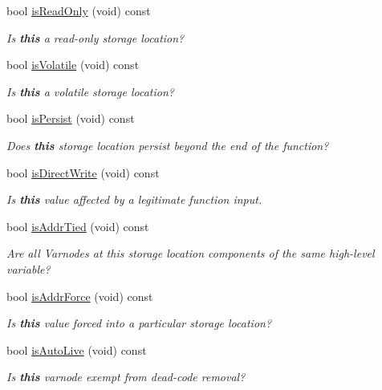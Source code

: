 \begin{DoxyCompactItemize}
bool \mbox{\hyperlink{class_varnode_a913083bc0e21082b8f2d2c19c479149f}{is\+Read\+Only}} (void) const
\begin{DoxyCompactList}\small\item\em Is {\bfseries{this}} a read-\/only storage location? \end{DoxyCompactList}\item 
bool \mbox{\hyperlink{class_varnode_ac93bac59635c06a0cf7092de6eddf1ff}{is\+Volatile}} (void) const
\begin{DoxyCompactList}\small\item\em Is {\bfseries{this}} a volatile storage location? \end{DoxyCompactList}\item 
bool \mbox{\hyperlink{class_varnode_aec0966bf2652cfd2d53a053f8df9fde1}{is\+Persist}} (void) const
\begin{DoxyCompactList}\small\item\em Does {\bfseries{this}} storage location persist beyond the end of the function? \end{DoxyCompactList}\item 
bool \mbox{\hyperlink{class_varnode_a9d5173dcb168690858927259268ec016}{is\+Direct\+Write}} (void) const
\begin{DoxyCompactList}\small\item\em Is {\bfseries{this}} value affected by a legitimate function input. \end{DoxyCompactList}\item 
bool \mbox{\hyperlink{class_varnode_a61fd3ac206edbb80a9c42f3b69755b61}{is\+Addr\+Tied}} (void) const
\begin{DoxyCompactList}\small\item\em Are all Varnodes at this storage location components of the same high-\/level variable? \end{DoxyCompactList}\item 
bool \mbox{\hyperlink{class_varnode_abbc8f37343674a6b64cd7910b9cfee25}{is\+Addr\+Force}} (void) const
\begin{DoxyCompactList}\small\item\em Is {\bfseries{this}} value forced into a particular storage location? \end{DoxyCompactList}\item 
bool \mbox{\hyperlink{class_varnode_aac7f04e1ba903cec5b68da2427165386}{is\+Auto\+Live}} (void) const
\begin{DoxyCompactList}\small\item\em Is {\bfseries{this}} varnode exempt from dead-\/code removal? \end{DoxyCompactList}\item 

\end{DoxyCompactItemize}
